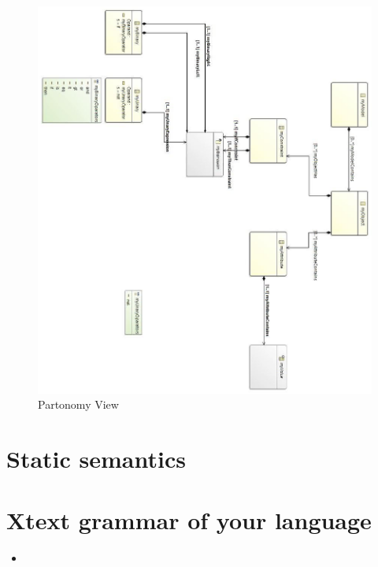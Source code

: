 \documentclass[paper=a4, fontsize=11pt]{scrartcl} %
\numberwithin{equation}{section} %
\numberwithin{figure}{section} %
\numberwithin{table}{section} %
\newcommand{\java}[2]{
\begin{itemize}
\item[]
\end{itemize}
}
\begin{document}
\begin{figure}[H]
\centering
\includegraphics[scale=0.7]{pictures/partView.jpg}
\caption{Partonomy View}
\end{figure}


\section{Static semantics}



\section{Xtext grammar of your language}
\java{../configproject/xtext/org.xtext.example.smdpdsl/src/org/xtext/example/mydsl/SmdpDsl.xtext}{Xtext Grammar}
\end{document}
